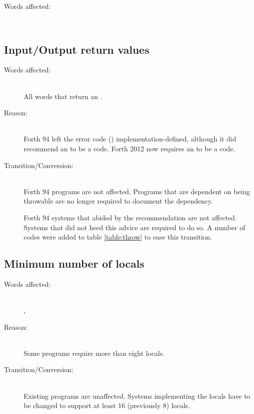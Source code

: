 \begin{description}
\item[Words affected:] ~\\
\end{description}


\subsection{Input/Output return values} %
\label{diff:12:ior}

\begin{description}
\item[Words affected:] ~\\
	All words that return an .

\item[Reason:] ~\\
	Forth 94 left the error code () implementation-defined,
	although it did recommend an  to be a 
	code.  Forth 2012 now requires an  to be a
	 code.

\item[Transition/Conversion:] ~\\
	Forth 94 programs are not affected.  Programs that are dependent
	on  being throwable are no longer required to document
	the dependency.

	Forth 94 systems that abided by the recommendation are not affected.
	Systems that did not heed this advice are required to do so. A
	number of  codes were added to table
	\ref{table:throw} to ease this transition.
\end{description}


\subsection{Minimum number of locals} %
\label{diff:12:locals}

\begin{description}
\item[Words affected:] ~\\
	, 

\item[Reason:] ~\\
	Some programs require more than eight locals.
 
\item[Transition/Conversion:] ~\\
	Existing programs are unaffected.  Systems implementing the locals
	 have to be changed to support at least 16 (previously 8)
	locals.
\end{description}


